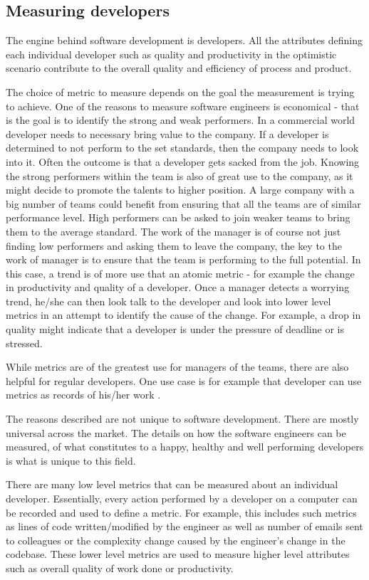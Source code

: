\documentclass[11pt]{article}
\begin{document}
\subsection{Measuring developers}
The engine behind software development is developers. All the attributes defining each individual developer such as quality and productivity in the optimistic scenario contribute to the overall quality and efficiency of process and product. 
\par 
The choice of metric to measure depends on the goal the measurement is trying to achieve. One of the reasons to measure software engineers is economical - that is the goal is to identify the strong and weak performers. In a commercial world developer needs to necessary bring value to the company. If a developer is determined to not perform to the set standards, then the company needs to look into it. Often the outcome is that a developer gets sacked from the job. Knowing the strong performers within the team is also of great use to the company, as it might decide to promote the talents to higher position. A large company with a big number of teams could benefit from ensuring that all the teams are of similar performance level. High performers can be asked to join weaker teams to bring them to the average standard. The work of the manager is of course not just finding low performers and asking them to leave the company, the key to the work of manager is to ensure that the team is performing to the full potential. In this case, a trend is of more use that an atomic metric - for example the change in productivity and quality of a developer. Once a manager detects a worrying trend, he/she can then look talk to the developer and look into lower level metrics in an attempt to identify the cause of the change. For example, a drop in quality might indicate that a developer is under the pressure of deadline or is stressed.
\par
While metrics are of the greatest use for managers of the teams, there are also helpful for regular developers. One use case is for example that developer can use metrics as records of his/her work .
\par 
The reasons described are not unique to software development. There are mostly universal across the market. The details on how the software engineers can be measured, of what constitutes to a happy, healthy and well performing developers is what is unique to this field. 
\par 
There are many low level metrics that can be measured about an individual developer. Essentially, every action performed by a developer on a computer can be recorded and used to define a metric. For example, this includes such metrics as lines of code written/modified by the engineer as well as number of emails sent to colleagues or the complexity change caused by the engineer's change in the codebase. These lower level metrics are used to measure higher level attributes such as overall quality of work done or productivity.
\end{document}
